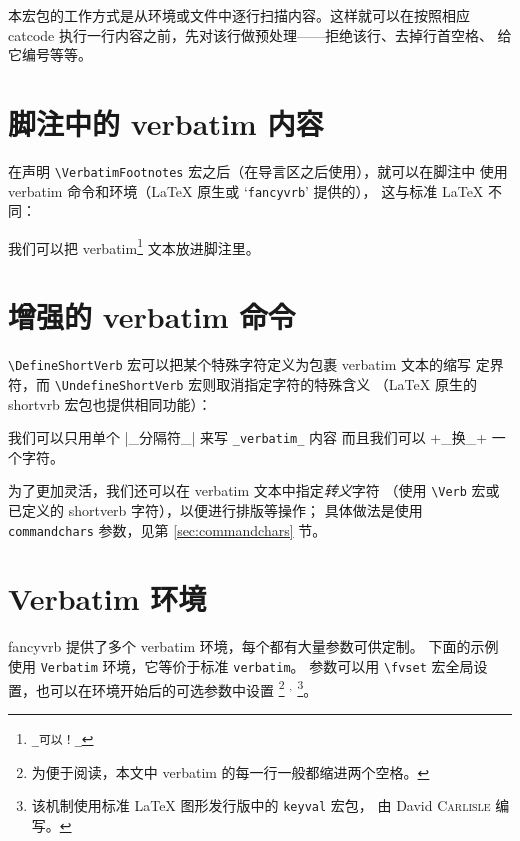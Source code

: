 \documentclass[twoside]{article}
\newcommand\FVrbPackage{`\texttt{fancyvrb}'}
\newcommand\cs[1]{\texttt{\textbackslash#1}}
\begin{document}
  本宏包的工作方式是从环境或文件中逐行扫描内容。这样就可以在按照相应
catcode 执行一行内容之前，先对该行做预处理——拒绝该行、去掉行首空格、
给它编号等等。

\section{脚注中的 verbatim 内容}

  在声明 \cs{VerbatimFootnotes} 宏之后（在导言区之后使用），就可以在脚注中
使用 verbatim 命令和环境（\LaTeX{} 原生或 \FVrbPackage{} 提供的），
这与标准 \LaTeX{} 不同：

\begin{Example}
  \VerbatimFootnotes
  我们可以把 verbatim\footnote{\verb+_可以！_+} 文本放进脚注里。
\end{Example}

\section{增强的 verbatim 命令}
%
  \cs{DefineShortVerb} 宏可以把某个特殊字符定义为包裹 verbatim 文本的缩写
定界符，而 \cs{UndefineShortVerb} 宏则取消指定字符的特殊含义
（\LaTeX{} 原生的 \textsf{shortvrb} 宏包也提供相同功能）：


\begin{SideBySideExample}
  \DefineShortVerb{\|}
  我们可以只用单个 |_分隔符_| 来写
  \Verb+_verbatim_+ 内容
  \UndefineShortVerb{\|}
  \DefineShortVerb{\+}
  而且我们可以 +_换_+ 一个字符。
\end{SideBySideExample}

  为了更加灵活，我们还可以在 verbatim 文本中指定\emph{转义}字符
（使用 \cs{Verb} 宏或已定义的 shortverb 字符），以便进行排版等操作；
具体做法是使用 \texttt{commandchars} 参数，见第 \ref{sec:commandchars} 节。

\section{Verbatim 环境}

fancyvrb 提供了多个 verbatim 环境，每个都有大量参数可供定制。
下面的示例使用 \texttt{Verbatim} 环境，它等价于标准 \texttt{verbatim}。
参数可以用 \cs{fvset} 宏全局设置，也可以在环境开始后的可选参数中设置
\footnote{为便于阅读，本文中 verbatim 的每一行一般都缩进两个空格。}
$^,$
\footnote{该机制使用标准 \LaTeX{} 图形发行版中的 \texttt{keyval} 宏包，
由 David \textsc{Carlisle} 编写。}。
\end{document}
